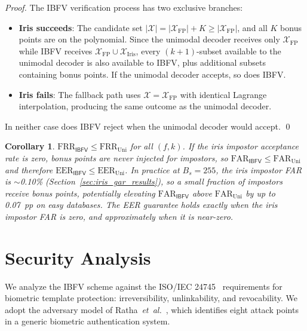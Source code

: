 \documentclass[3p,twocolumn]{elsarticle}
\newtheorem{corollary}{Corollary}
\newcommand{\IBFV}{\textsf{IBFV}}
\newcommand{\EER}{\mathrm{EER}}
\newcommand{\FAR}{\mathrm{FAR}}
\newcommand{\FRR}{\mathrm{FRR}}
\begin{document}
\begin{proof}
The \IBFV{} verification process has two exclusive branches:
\begin{itemize}
    \item \textbf{Iris succeeds}: The candidate set $|\mathcal{X}| = |\mathcal{X}_{\text{FP}}| + K \geq |\mathcal{X}_{\text{FP}}|$, and all $K$ bonus points are on the polynomial. Since the unimodal decoder receives only $\mathcal{X}_{\text{FP}}$ while \IBFV{} receives $\mathcal{X}_{\text{FP}} \cup \mathcal{X}_{\text{Iris}}$, every $(k{+}1)$-subset available to the unimodal decoder is also available to \IBFV{}, plus additional subsets containing bonus points. If the unimodal decoder accepts, so does \IBFV{}.
    \item \textbf{Iris fails}: The fallback path uses $\mathcal{X} = \mathcal{X}_{\text{FP}}$ with identical Lagrange interpolation, producing the same outcome as the unimodal decoder.
\end{itemize}
In neither case does \IBFV{} reject when the unimodal decoder would accept. \qed
\end{proof}

\begin{corollary}
$\FRR_{\IBFV} \leq \FRR_{\text{Uni}}$ for all $(f,k)$. If the iris impostor acceptance rate is zero, bonus points are never injected for impostors, so $\FAR_{\IBFV} \leq \FAR_{\text{Uni}}$ and therefore $\EER_{\IBFV} \leq \EER_{\text{Uni}}$. In practice at $B_s = 255$, the iris impostor FAR is $\sim$0.10\% (Section~\ref{sec:iris_gar_results}), so a small fraction of impostors receive bonus points, potentially elevating $\FAR_{\IBFV}$ above $\FAR_{\text{Uni}}$ by up to 0.07~pp on easy databases. The EER guarantee holds exactly when the iris impostor FAR is zero, and approximately when it is near-zero.
\end{corollary}

\section{Security Analysis}
\label{sec:security}

We analyze the \IBFV{} scheme against the ISO/IEC 24745~\cite{iso24745} requirements for biometric template protection: irreversibility, unlinkability, and revocability. We adopt the adversary model of Ratha~\textit{et~al.}~\cite{ratha2001enhancing}, which identifies eight attack points in a generic biometric authentication system.
\end{document}
